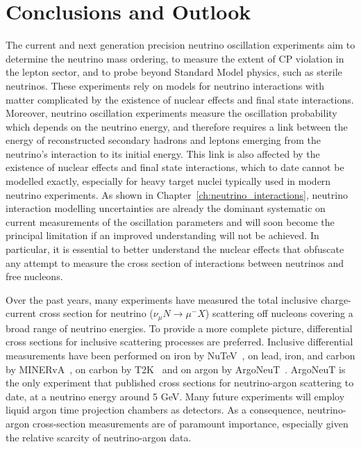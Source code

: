 \chapter{Conclusions and Outlook}
\label{ch:conclusions}



The current and next generation precision neutrino oscillation experiments aim to determine the neutrino mass ordering, to measure the extent of CP violation in the lepton sector, and to probe beyond Standard Model physics, such as sterile neutrinos.  These experiments rely on models for neutrino interactions with matter complicated by the existence of nuclear effects and final state interactions. Moreover, neutrino oscillation experiments measure the oscillation probability which depends on the neutrino energy, and therefore requires a link between the energy of reconstructed secondary hadrons and leptons emerging from the neutrino's interaction to its initial energy. This link is also affected by the existence of nuclear effects and final state interactions, which to date cannot be modelled exactly, especially for heavy target nuclei typically used in modern neutrino experiments. 
As shown in Chapter~\ref{ch:neutrino_interactions}, neutrino interaction modelling uncertainties are already the dominant systematic on current measurements of the oscillation parameters and will soon become the principal limitation if an improved understanding will not be achieved. In particular, it is essential to better understand the nuclear effects that obfuscate any attempt to measure the cross section of interactions between neutrinos and free nucleons.

Over the past years, many experiments have measured the total inclusive charge-current cross section for neutrino ($\nu_\mu N \rightarrow \mu^- X$) scattering off nucleons covering a broad range of neutrino energies. To provide a more complete picture, differential cross sections for inclusive scattering processes are preferred. Inclusive differential measurements have been performed on iron by NuTeV~\cite{NuTeV}, on lead, iron, and carbon by MINERvA~\cite{MINERvACCincl3}, on carbon by T2K~\cite{t2k_ccinclusive_2018} and on argon by ArgoNeuT~\cite{ArgoNeuTCCincl, ArgoNeuTCCincl2}. ArgoNeuT is the only experiment that published cross sections for neutrino-argon scattering to date, at a neutrino energy around 5 GeV.
Many future experiments will employ liquid argon time projection chambers as detectors. As a consequence, neutrino-argon cross-section measurements are of paramount importance, especially given the relative scarcity of neutrino-argon data.

